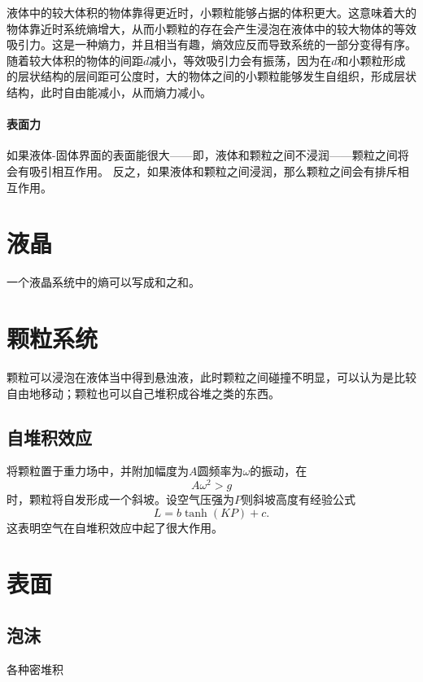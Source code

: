 液体中的较大体积的物体靠得更近时，小颗粒能够占据的体积更大。这意味着大的物体靠近时系统熵增大，从而小颗粒的存在会产生浸泡在液体中的较大物体的等效吸引力。这是一种熵力，并且相当有趣，熵效应反而导致系统的一部分变得有序。
随着较大体积的物体的间距$d$减小，等效吸引力会有振荡，因为在$d$和小颗粒形成的层状结构的层间距可公度时，大的物体之间的小颗粒能够发生自组织，形成层状结构，此时自由能减小，从而熵力减小。

\subsubsection{表面力}

如果液体-固体界面的表面能很大——即，液体和颗粒之间不浸润——颗粒之间将会有吸引相互作用。
反之，如果液体和颗粒之间浸润，那么颗粒之间会有排斥相互作用。

\chapter{液晶}

一个液晶系统中的熵可以写成和之和。

\chapter{颗粒系统}

颗粒可以浸泡在液体当中得到悬浊液，此时颗粒之间碰撞不明显，可以认为是比较自由地移动；颗粒也可以自己堆积成谷堆之类的东西。

\section{自堆积效应}

将颗粒置于重力场中，并附加幅度为$A$圆频率为$\omega$的振动，在
\begin{equation}
    A \omega^2 > g
\end{equation}
时，颗粒将自发形成一个斜坡。设空气压强为$P$则斜坡高度有经验公式
\begin{equation}
    L = b \tanh(KP) + c.
\end{equation}
这表明空气在自堆积效应中起了很大作用。

\chapter{表面}

\section{泡沫}

各种密堆积